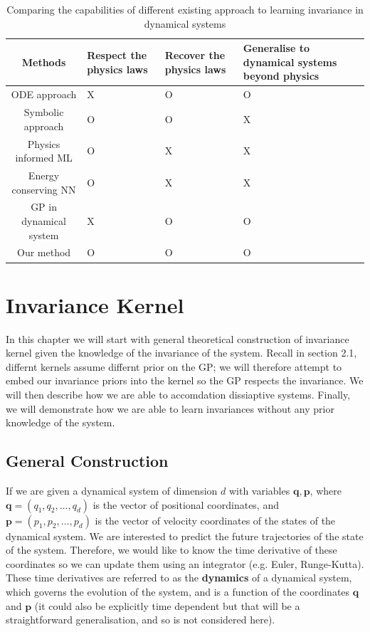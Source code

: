 \documentclass{statsmsc}
\begin{document}
\begin{table}[H]
    \centering
\begin{tabularx}{\linewidth}{c|LLL} 
    \hline
 Methods & Respect the physics laws & Recover the physics laws & Generalise to dynamical systems beyond physics  \\ 
    \hline
  ODE approach & X & O & O \\
  Symbolic approach & O & O & X \\
  Physics informed ML & O & X & X \\
  Energy conserving NN & O & X & X \\
  GP in dynamical system & X & O & O\\
  Our method & O & O & O\\
    \hline
\end{tabularx}
\caption{Comparing the capabilities of different existing approach to learning invariance in dynamical systems}
\label{tab:compare}
    \end{table}



\chapter{Invariance Kernel}
In this chapter we will start with general theoretical construction of invariance kernel given the knowledge of the invariance of the system.
Recall in section 2.1, differnt kernels assume differnt prior on the GP; we will therefore attempt to embed our invariance priors into the kernel so the GP respects the invariance.
We will then describe how we are able to accomdation dissiaptive systems.
Finally, we will demonstrate how we are able to learn invariances without any prior knowledge of the system.

\section{General Construction}
If we are given a dynamical system of dimension $d$ with variables $\mathbf{q}, \mathbf{p}$, where $\mathbf{q} = (q_1, q_2,\dots,q_d)$ is the vector of positional coordinates, and $\mathbf{p}=(p_1, p_2, \dots, p_d)$ is the vector of velocity coordinates of the states of the dynamical system.
We are interested to predict the future trajectories of the state of the system.
Therefore, we would like to know the time derivative of these coordinates so we can update them using an integrator (e.g. Euler, Runge-Kutta). 
These time derivatives are referred to as the \textbf{dynamics} of a dynamical system, which governs the evolution of the system, and is a function of the coordinates $\mathbf{q}$ and $\mathbf{p}$ (it could also be explicitly time dependent but that will be a straightforward generalisation, and so is not considered here). 
\end{document}

